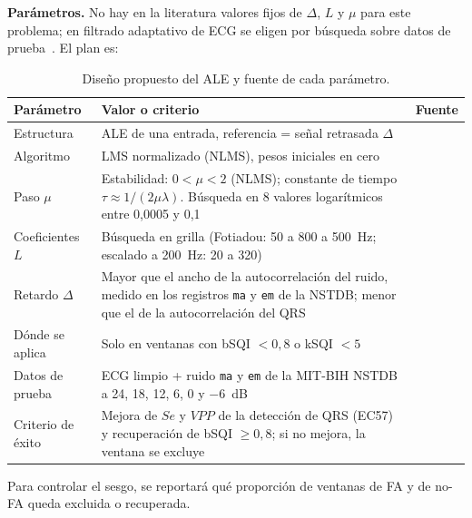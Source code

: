 \documentclass[11pt,a4paper]{article}
\begin{document}
\textbf{Parámetros.} No hay en la literatura valores fijos de $\Delta$, $L$ y $\mu$ para este problema; en filtrado adaptativo de ECG se eligen por búsqueda sobre datos de prueba~\cite{fotiadou2018}. El plan es:

\begin{table}[H]
  \centering
  \small
  \caption{Diseño propuesto del ALE y fuente de cada parámetro.}
  \label{tab:ale}
  \begin{tabular}{p{2.6cm}p{6.6cm}p{3.6cm}}
    \toprule
    Parámetro & Valor o criterio & Fuente \\
    \midrule
    Estructura & ALE de una entrada, referencia = señal retrasada $\Delta$ & \cite{widrow1975} \\
    Algoritmo & LMS normalizado (NLMS), pesos iniciales en cero & \cite{fotiadou2018} \\
    Paso $\mu$ & Estabilidad: $0 < \mu < 2$ (NLMS); constante de tiempo $\tau \approx 1/(2\mu\lambda)$. Búsqueda en 8 valores logarítmicos entre 0,0005 y 0,1 & \cite{haykin2002,nosc1977,fotiadou2018} \\
    Coeficientes $L$ & Búsqueda en grilla (Fotiadou: 50 a 800 a 500~Hz; escalado a 200~Hz: 20 a 320) & \cite{fotiadou2018} \\
    Retardo $\Delta$ & Mayor que el ancho de la autocorrelación del ruido, medido en los registros \texttt{ma} y \texttt{em} de la NSTDB; menor que el de la autocorrelación del QRS & \cite{widrow1975,moody1984} \\
    Dónde se aplica & Solo en ventanas con bSQI $< 0{,}8$ o kSQI $< 5$ & \cite{chocron2020,zhao2018} \\
    Datos de prueba & ECG limpio + ruido \texttt{ma} y \texttt{em} de la MIT-BIH NSTDB a 24, 18, 12, 6, 0 y $-6$~dB & \cite{moody1984} \\
    Criterio de éxito & Mejora de $Se$ y $VPP$ de la detección de QRS (EC57) y recuperación de bSQI $\geq 0{,}8$; si no mejora, la ventana se excluye & \cite{ec57,chocron2020} \\
    \bottomrule
  \end{tabular}
\end{table}

Para controlar el sesgo, se reportará qué proporción de ventanas de FA y de no-FA queda excluida o recuperada.
\end{document}
